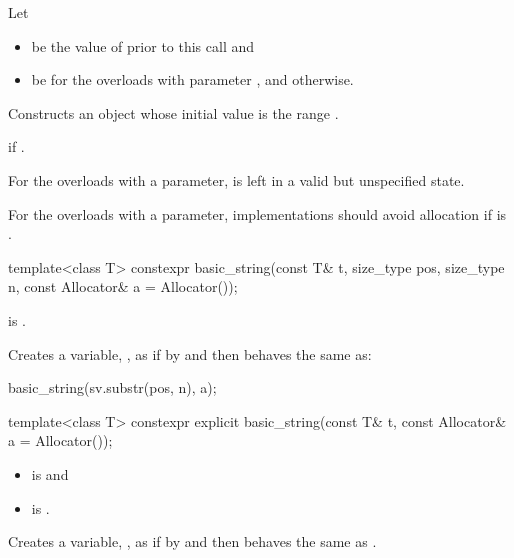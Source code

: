 \begin{itemdescr}
\pnum
Let
\begin{itemize}
\item
{} be the value of  prior to this call and
\item
{} be 
for the overloads with parameter , and
 otherwise.
\end{itemize}

\pnum
\effects
Constructs an object
whose initial value is the range .

\pnum
\throws
{} if .

\pnum
\remarks
For the overloads with a  parameter,
 is left in a valid but unspecified state.

\pnum
\recommended
For the overloads with a  parameter,
implementations should avoid allocation
if  is .
\end{itemdescr}

%
\begin{itemdecl}
template<class T>
  constexpr basic_string(const T& t, size_type pos, size_type n, const Allocator& a = Allocator());
\end{itemdecl}

\begin{itemdescr}
\pnum
\constraints
{}
is .

\pnum
\effects
Creates a variable, ,
as if by 
and then behaves the same as:
\begin{codeblock}
basic_string(sv.substr(pos, n), a);
\end{codeblock}
\end{itemdescr}

%
\begin{itemdecl}
template<class T>
  constexpr explicit basic_string(const T& t, const Allocator& a = Allocator());
\end{itemdecl}

\begin{itemdescr}
\pnum
\constraints
\begin{itemize}
\item
{} is
 and
\item
{} is
.
\end{itemize}

\pnum
\effects
Creates a variable, , as if by
 and
then behaves the same as .
\end{itemdescr}

